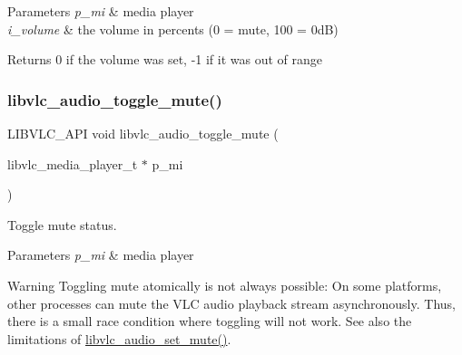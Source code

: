 \begin{DoxyParams}{Parameters}
{\em p\+\_\+mi} & media player \\
\hline
{\em i\+\_\+volume} & the volume in percents (0 = mute, 100 = 0dB) \\
\hline
\end{DoxyParams}
\begin{DoxyReturn}{Returns}
0 if the volume was set, -\/1 if it was out of range 
\end{DoxyReturn}
\mbox{\label{group__libvlc__audio_ga3066a6b5b7b2648ca403ecc506b02116}} 
\subsubsection{\texorpdfstring{libvlc\+\_\+audio\+\_\+toggle\+\_\+mute()}{libvlc\_audio\_toggle\_mute()}}
{\footnotesize\ttfamily L\+I\+B\+V\+L\+C\+\_\+\+A\+PI void libvlc\+\_\+audio\+\_\+toggle\+\_\+mute (\begin{DoxyParamCaption}\item[{libvlc\+\_\+media\+\_\+player\+\_\+t $\ast$}]{p\+\_\+mi }\end{DoxyParamCaption})}

Toggle mute status.


\begin{DoxyParams}{Parameters}
{\em p\+\_\+mi} & media player \\
\hline
\end{DoxyParams}
\begin{DoxyWarning}{Warning}
Toggling mute atomically is not always possible\+: On some platforms, other processes can mute the V\+LC audio playback stream asynchronously. Thus, there is a small race condition where toggling will not work. See also the limitations of \hyperlink{group__libvlc__audio_ga438620a3c817b8b4faceb77c476b89fe}{libvlc\+\_\+audio\+\_\+set\+\_\+mute()}. 
\end{DoxyWarning}
\mbox{\label{group__libvlc__audio_ga0d355443d391d0bc2dafe9b6963a8f53}} 
